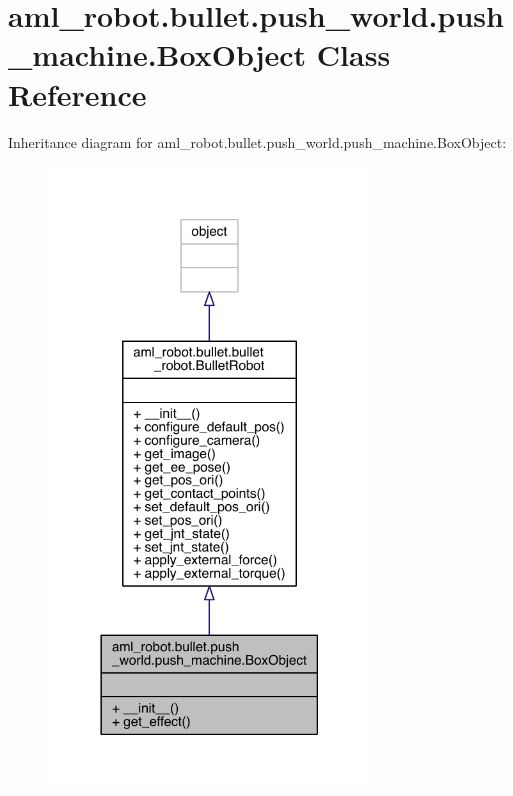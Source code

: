 \hypertarget{classaml__robot_1_1bullet_1_1push__world_1_1push__machine_1_1_box_object}{}\section{aml\+\_\+robot.\+bullet.\+push\+\_\+world.\+push\+\_\+machine.\+Box\+Object Class Reference}
\label{classaml__robot_1_1bullet_1_1push__world_1_1push__machine_1_1_box_object}


Inheritance diagram for aml\+\_\+robot.\+bullet.\+push\+\_\+world.\+push\+\_\+machine.\+Box\+Object\+:
\nopagebreak
\begin{figure}[H]
\begin{center}
\leavevmode
\includegraphics[width=242pt]{classaml__robot_1_1bullet_1_1push__world_1_1push__machine_1_1_box_object__inherit__graph}
\end{center}
\end{figure}


